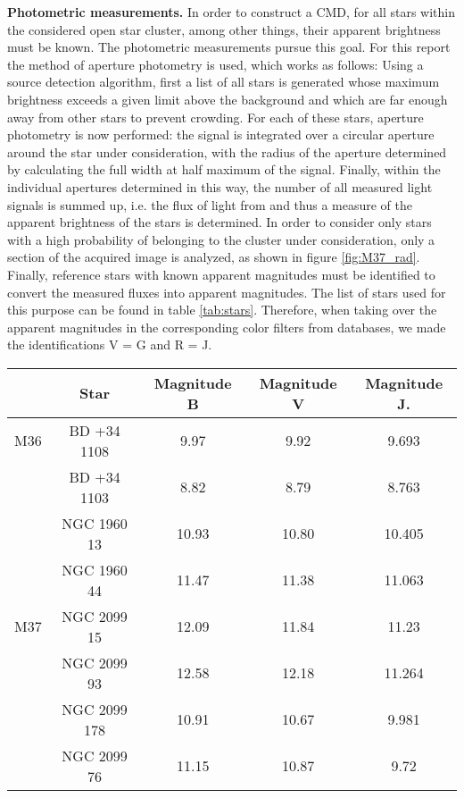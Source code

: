 \documentclass[fleqn,10pt]{SelfArx} %
\begin{document}
\textbf{Photometric measurements.}
In order to construct a CMD, for all stars within the considered open star cluster, among other things, their apparent brightness must be known. The photometric measurements pursue this goal. For this report the method of aperture photometry is used, which works as follows: Using a source detection algorithm, first a list of all stars is generated whose maximum brightness exceeds a given limit above the background and which are far enough away from other stars to prevent crowding. For each of these stars, aperture photometry is now performed: the signal is integrated over a circular aperture around the star under consideration, with the radius of the aperture determined by calculating the full width at half maximum of the signal. Finally, within the individual apertures determined in this way, the number of all measured light signals is summed up, i.e. the flux of light from and thus a measure of the apparent brightness of the stars is determined. In order to consider only stars with a high probability of belonging to the cluster under consideration, only a section of the acquired image is analyzed, as shown in figure \ref{fig:M37_rad}. Finally, reference stars with known apparent magnitudes must be identified to convert the measured fluxes into apparent magnitudes. The list of stars used for this purpose can be found in table \ref{tab:stars}. Therefore, when taking over the apparent magnitudes in the corresponding color filters from databases, we made the identifications V = G and R = J.

\begin{table*}
    \centering
    \begin{tabular}{c||c|c|c|c}
        \   &   Star            &   Magnitude B &   Magnitude V &   Magnitude J.\\ \hline \hline
        M36 &   BD +34 1108     &   9.97        &   9.92        &   9.693       \\ \hline
        \   &   BD +34 1103     &   8.82        &   8.79        &   8.763       \\ \hline
        \   &   NGC 1960 13     &   10.93       &   10.80       &   10.405      \\ \hline
        \   &   NGC 1960 44     &   11.47       &   11.38       &   11.063      \\ \hline \hline
        M37 &   NGC 2099 15     &   12.09       &   11.84       &   11.23       \\ \hline
        \   &   NGC 2099 93     &   12.58       &   12.18       &   11.264      \\ \hline
        \   &   NGC 2099 178    &   10.91       &   10.67       &   9.981       \\ \hline
        \   &   NGC 2099 76     &   11.15       &   10.87       &   9.72
    \end{tabular}
    \caption{Reference stars for M36 and M37. Data taken from \url{https://aladin.cds.unistra.fr/AladinLite/} and \url{http://cdsportal.u-strasbg.fr/}.}
    \label{tab:stars}
\end{table*}
\end{document}
